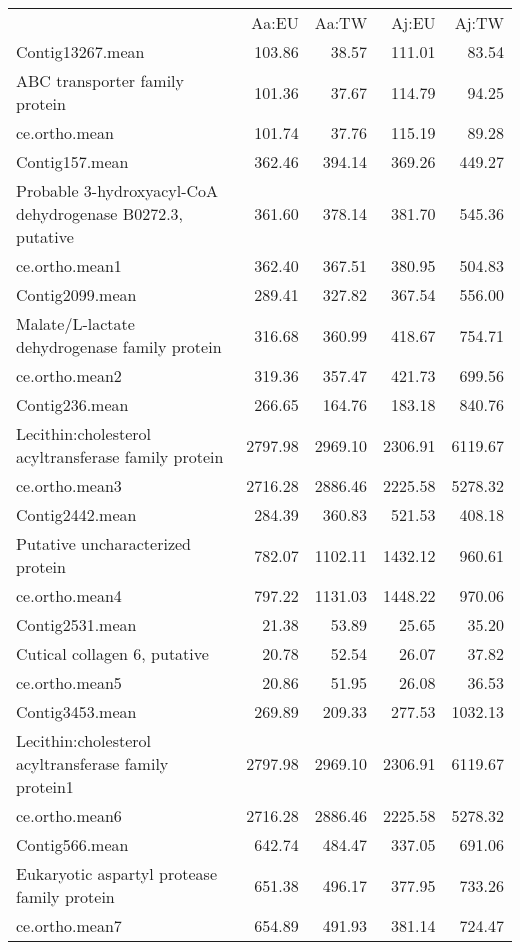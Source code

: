 \begin{table}[ht]
\begin{center}
\begin{tabular}{p{5cm}rrrr}
  & Aa:EU & Aa:TW & Aj:EU & Aj:TW \\ 
 Contig13267.mean & 103.86 & 38.57 & 111.01 & 83.54 \\ 
  ABC transporter family protein & 101.36 & 37.67 & 114.79 & 94.25 \\ 
  ce.ortho.mean & 101.74 & 37.76 & 115.19 & 89.28 \\ 
   \hline
Contig157.mean & 362.46 & 394.14 & 369.26 & 449.27 \\ 
  Probable 3-hydroxyacyl-CoA dehydrogenase B0272.3, putative & 361.60 & 378.14 & 381.70 & 545.36 \\ 
  ce.ortho.mean1 & 362.40 & 367.51 & 380.95 & 504.83 \\ 
   \hline
Contig2099.mean & 289.41 & 327.82 & 367.54 & 556.00 \\ 
  Malate/L-lactate dehydrogenase family protein & 316.68 & 360.99 & 418.67 & 754.71 \\ 
  ce.ortho.mean2 & 319.36 & 357.47 & 421.73 & 699.56 \\ 
   \hline
Contig236.mean & 266.65 & 164.76 & 183.18 & 840.76 \\ 
  Lecithin:cholesterol acyltransferase family protein & 2797.98 & 2969.10 & 2306.91 & 6119.67 \\ 
  ce.ortho.mean3 & 2716.28 & 2886.46 & 2225.58 & 5278.32 \\ 
   \hline
Contig2442.mean & 284.39 & 360.83 & 521.53 & 408.18 \\ 
  Putative uncharacterized protein & 782.07 & 1102.11 & 1432.12 & 960.61 \\ 
  ce.ortho.mean4 & 797.22 & 1131.03 & 1448.22 & 970.06 \\ 
   \hline
Contig2531.mean & 21.38 & 53.89 & 25.65 & 35.20 \\ 
  Cutical collagen 6, putative & 20.78 & 52.54 & 26.07 & 37.82 \\ 
  ce.ortho.mean5 & 20.86 & 51.95 & 26.08 & 36.53 \\ 
   \hline
Contig3453.mean & 269.89 & 209.33 & 277.53 & 1032.13 \\ 
  Lecithin:cholesterol acyltransferase family protein1 & 2797.98 & 2969.10 & 2306.91 & 6119.67 \\ 
  ce.ortho.mean6 & 2716.28 & 2886.46 & 2225.58 & 5278.32 \\ 
   \hline
Contig566.mean & 642.74 & 484.47 & 337.05 & 691.06 \\ 
  Eukaryotic aspartyl protease family protein & 651.38 & 496.17 & 377.95 & 733.26 \\ 
  ce.ortho.mean7 & 654.89 & 491.93 & 381.14 & 724.47 \\ 
   \hline



\end{tabular}
\end{center}
\end{table}

